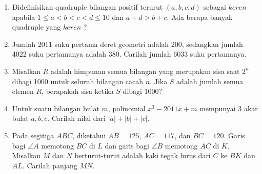 \documentclass{article}
\begin{document}
\begin{enumerate}
	\item
	Didefinisikan quadruple bilangan positif terurut $(a,b,c,d)$ sebagai $keren$ apabila $1 \le a < b < c < d \le 10$ dan $a+d > b+c$. Ada berapa banyak quadruple yang $keren$ ?
	
	\item  Jumlah 2011 suku pertama deret geometri adalah 200, sedangkan jumlah 4022 suku pertamanya adalah 380. Carilah jumlah 6033 suku pertamanya.
	
	\item
	Misalkan $R$ adalah himpunan semua bilangan yang merupakan sisa saat $2^n$ dibagi 1000 untuk seluruh bilangan cacah $n$. Jika $S$ adalah jumlah semua elemen $R$, berapakah sisa ketika $S$ dibagi 1000?
	
	\item
	Untuk suatu bilangan bulat $m$, polinomial $x^3-2011x+m$ mempunyai 3 akar bulat $a,b,c$. Carilah nilai dari $|a|+|b|+|c|$.
	
	\item
	Pada segitiga $ABC$, diketahui $AB=125$, $AC=117$, dan $BC=120$. Garis bagi $\angle A$ memotong $BC$ di $L$ dan garis bagi $\angle B$ memotong $AC$ di $K$. Misalkan $M$ dan $N$ berturut-turut adalah kaki tegak lurus dari $C$ ke $BK$ dan $AL$. Carilah panjang $MN$.
	\end{enumerate}
\end{document}
